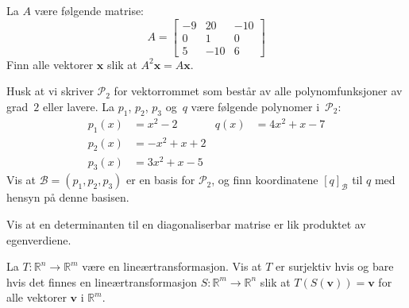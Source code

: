 \documentclass[titlepage,a4paper,12pt,norsk]{IMFeksamen}
\newcommand{\R}{\mathbb{R}}
\renewcommand{\P}{\mathcal{P}} %
\newcommand{\B}{\mathscr{B}} %
\DeclareMathOperator{\Sp}{Sp}
\newcommand{\V}[1]{\mathbf{#1}}
\newcommand{\vvv}[3]{\begin{bmatrix} #1 \\ #2 \\ #3 \end{bmatrix}}
\renewcommand{\v}{\V{v}}
\newcommand{\x}{\V{x}}
\newcommand{\0}{\V{0}}
\begin{document}
\begin{oppgave}
La $A$ være følgende matrise:
\[
A =
\begin{bmatrix}
-9 &  20 & -10 \\
 0 &   1 &   0 \\
 5 & -10 &   6
\end{bmatrix}
\]
Finn alle vektorer $\x$ slik at $A^2 \x = A \x$.
\end{oppgave}


\begin{oppgave}
Husk at vi skriver $\P_2$ for vektorrommet som består av alle
polynomfunksjoner av grad~$2$ eller lavere.  La $p_1$, $p_2$, $p_3$
og~$q$ være følgende polynomer i~$\P_2$:
\begin{align*}
p_1(x) &= x^2 - 2    &   q(x) &= 4x^2 + x - 7  \\
p_2(x) &= -x^2 + x + 2 \\
p_3(x) &= 3x^2 + x - 5
\end{align*}
Vis at $\B = (p_1, p_2, p_3)$ er en basis for $\P_2$,
og finn koordinatene $[ q ]_\B$ til $q$ med hensyn på denne basisen.
\end{oppgave}


\begin{oppgave}
Vis at en determinanten til en diagonaliserbar matrise er lik produktet av egenverdiene.
\end{oppgave}


\begin{oppgave}
La $T \colon \R^n \to \R^m$ være en lineærtransformasjon.
Vis at $T$ er surjektiv hvis og bare hvis det finnes en
lineærtransformasjon $S \colon \R^m \to \R^n$ slik at
$T(S(\v)) = \v$ for alle vektorer $\v$ i $\R^m$.
\end{oppgave}
\end{document}
